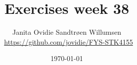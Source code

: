\documentclass[reprint,english,notitlepage]{revtex4-1}  %
\begin{document}

\title{Exercises week 38}
\author{Janita Ovidie Sandtrøen Willumsen \\ \faGithub \, \url{https://github.com/jovidie/FYS-STK4155}}        
\date{\today}
\noaffiliation

\maketitle

\onecolumngrid
% 
% 
% 

% 
% 
% 
% 
% 
% 
% 
 
% 



\end{document}
